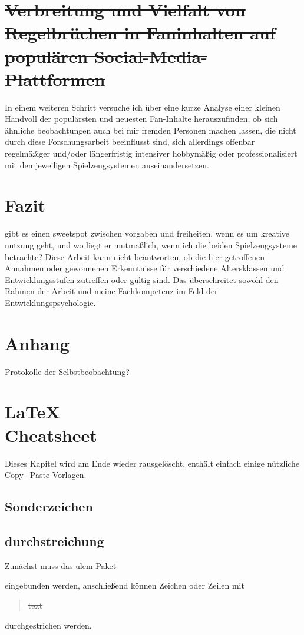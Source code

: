 \documentclass[11pt,a4paper,twoside]{scrreprt}
\begin{document}
\chapter{\sout{Verbreitung und Vielfalt von Regelbrüchen in Faninhalten auf populären Social-Media-Plattformen}}
In einem weiteren Schritt versuche ich über eine kurze Analyse einer kleinen Handvoll der populärsten und neuesten Fan-Inhalte herauszufinden, ob sich ähnliche beobachtungen auch bei mir fremden Personen machen lassen, die nicht durch diese Forschungsarbeit beeinflusst sind, sich allerdings offenbar regelmäßiger und/oder längerfristig intensiver hobbymäßig oder professionalisiert mit den jeweiligen Spielzeugsystemen auseinandersetzen.


\chapter{Fazit}
gibt es einen sweetspot zwischen vorgaben und freiheiten, wenn es um kreative nutzung geht, und wo liegt er mutmaßlich, wenn ich die beiden Spielzeugsysteme betrachte? Diese Arbeit kann nicht beantworten, ob die hier getroffenen Annahmen oder gewonnenen Erkenntnisse für verschiedene Altersklassen und Entwicklungsstufen zutreffen oder gültig sind. Das überschreitet sowohl den Rahmen der Arbeit und meine Fachkompetenz im Feld der Entwicklungspsychologie.

\chapter{Anhang}
Protokolle der Selbstbeobachtung? 


\chapter{\LaTeX{}\\Cheatsheet}
Dieses Kapitel wird am Ende wieder rausgelöscht, enthält einfach einige nützliche Copy+Paste-Vorlagen.
\section{Sonderzeichen}
\textcopyright
\textregistered
\texttrademark

\section{durchstreichung}
Zunächst muss das ulem-Paket \begin{code}\usepackage{ulem}\end{code} eingebunden werden, anschließend können Zeichen oder Zeilen mit \begin{quotation}\sout{text}\end{quotation} durchgestrichen werden.
\end{document}
